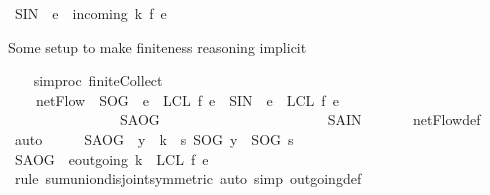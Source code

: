 \begin{isabellebody}
\ {\isacharquery}SIN{\isacharprime}\ {\isacharequal}\ {\isachardoublequoteopen}{\isacharparenleft}{\isasymSum}e\ {\isasymin}\ incoming{\isacharprime}\ k{\isachardot}\ f\ e{\isacharparenright}{\isachardoublequoteclose}%
\begin{isamarkuptext}%
Some setup to make finiteness reasoning implicit%
\end{isamarkuptext}\isamarkuptrue%
\ \ \isamarkupfalse%
\ {\isacharbrackleft}{\isacharbrackleft}simproc\ finite{\isacharunderscore}Collect{\isacharbrackright}{\isacharbrackright}\isanewline
\isanewline
\ \ \isamarkupfalse%
\ \ \isanewline
\ \ \ \ {\isachardoublequoteopen}netFlow\ {\isacharequal}\ {\isacharquery}SOG{\isacharprime}\ {\isacharplus}\ {\isacharparenleft}{\isasymSum}e\ {\isasymin}\ {\isacharquery}LCL{\isachardot}\ f\ e{\isacharparenright}\ {\isacharminus}\ {\isacharparenleft}{\isacharquery}SIN{\isacharprime}\ {\isacharplus}\ {\isacharparenleft}{\isasymSum}e\ {\isasymin}\ {\isacharquery}LCL{\isachardot}\ f\ e{\isacharparenright}{\isacharparenright}{\isachardoublequoteclose}\ \isanewline
\ \ \ \ {\isacharparenleft}\ {\isachardoublequoteopen}{\isacharunderscore}\ \ \ {\isacharequal}\ \ \ \ \ \ \ \ {\isacharquery}SAOG\ \ \ \ \ \ \ \ \ \ \ \ \ \ {\isacharminus}\ \ \ \ \ \ \ \ \ \ {\isacharquery}SAIN{\isachardoublequoteclose}{\isacharparenright}\ \isanewline
\ \ \ \ \isamarkupfalse%
\ netFlow{\isacharunderscore}def\ \isamarkupfalse%
\ auto\isanewline
\ \ \isamarkupfalse%
\ \isamarkupfalse%
\ {\isachardoublequoteopen}{\isacharquery}SAOG\ {\isacharequal}\ {\isacharparenleft}{\isasymSum}y\ {\isasymin}\ k\ {\isacharminus}\ {\isacharbraceleft}s{\isacharbraceright}{\isachardot}\ {\isacharquery}SOG\ y{\isacharparenright}\ {\isacharplus}\ {\isacharquery}SOG\ s{\isachardoublequoteclose}\isanewline
\ \ \isamarkupfalse%
\ {\isacharminus}\isanewline
\ \ \ \ \isamarkupfalse%
\ {\isachardoublequoteopen}{\isacharquery}SAOG\ {\isacharequal}\ {\isacharparenleft}{\isasymSum}e{\isasymin}{\isacharparenleft}outgoing{\isacharprime}\ k\ {\isasymunion}\ {\isacharquery}LCL{\isacharparenright}{\isachardot}\ f\ e{\isacharparenright}{\isachardoublequoteclose}\isanewline
\ \ \ \ \ \ \isamarkupfalse%
\ {\isacharparenleft}rule\ sum{\isachardot}union{\isacharunderscore}disjoint{\isacharbrackleft}symmetric{\isacharbrackright}{\isacharparenright}\ {\isacharparenleft}auto\ simp{\isacharcolon}\ outgoing{\isacharprime}{\isacharunderscore}def{\isacharparenright}\isanewline

\end{isabellebody}
